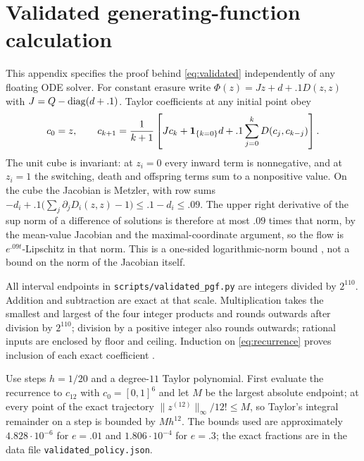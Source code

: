 \section{Validated generating-function calculation}
\label{app:validated}

This appendix specifies the proof behind \eqref{eq:validated} independently of
any floating ODE solver. For constant erasure write $\Phi(z)=Jz+d+.1D(z,z)$
with $J=Q-\operatorname{diag}(d+.1)$. Taylor coefficients at any initial point obey
\begin{equation}\label{eq:recurrence}
 c_0=z,\qquad
 c_{k+1}=\frac1{k+1}\left[Jc_k+\mathbf1_{\{k=0\}}d
              +.1\sum_{j=0}^kD(c_j,c_{k-j})\right].
\end{equation}
The unit cube is invariant: at $z_i=0$ every inward term is nonnegative, and at
$z_i=1$ the switching, death and offspring terms sum to a nonpositive value. On
the cube the Jacobian is Metzler, with row sums
$-d_i+.1\bigl(\sum_j\partial_jD_i(z,z)-1\bigr)\le.1-d_i\le.09$. The upper right
derivative of the sup norm of a difference of solutions is therefore at most
$.09$ times that norm, by the mean-value Jacobian and the maximal-coordinate
argument, so the flow is $e^{.09t}$-Lipschitz in that norm. This is a one-sided
logarithmic-norm bound \citep{soderlind2006}, not a bound on the norm of the
Jacobian itself.

All interval endpoints in \texttt{scripts/validated\_pgf.py} are integers
divided by $2^{110}$. Addition and subtraction are exact at that scale.
Multiplication takes the smallest and largest of the four integer products and
rounds outwards after division by $2^{110}$; division by a positive integer also
rounds outwards; rational inputs are enclosed by floor and ceiling. Induction on
\eqref{eq:recurrence} proves inclusion of each exact coefficient
\citep{moore2009}.

Use steps $h=1/20$ and a degree-$11$ Taylor polynomial. First evaluate the
recurrence to $c_{12}$ with $c_0=[0,1]^6$ and let $M$ be the largest absolute
endpoint; at every point of the exact trajectory
$\|z^{(12)}\|_\infty/12!\le M$, so Taylor's integral remainder on a step is
bounded by $Mh^{12}$. The bounds used are approximately $4.828\cdot10^{-6}$ for
$e=.01$ and $1.806\cdot10^{-4}$ for $e=.3$; the exact fractions are in
the data file \texttt{validated\_policy.json}.

